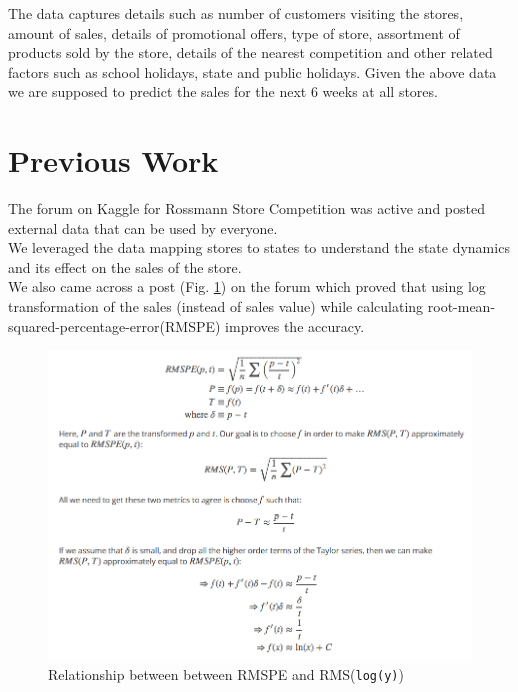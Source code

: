 \documentclass[12pt,a4paper]{article}
\begin{document}
The data captures details such as number of customers visiting the stores, amount of sales, details of promotional offers, type of store, assortment of products sold by the store, details of the nearest competition and other related factors such as school holidays, state and public holidays. Given the above data we are supposed to predict the sales for the next 6 weeks at all stores.

\section{Previous Work}
\label{previous}

The forum on Kaggle for Rossmann Store Competition was active and posted external data \cite{externaldata} that can be used by everyone. \\ We leveraged the data mapping stores to states\cite{storeonmap} to understand the state dynamics and its effect on the sales of the store. \\ We also came across a post\cite{logtransform} (Fig. \ref{fig:logtransform}) on the forum which proved that using log transformation of the sales (instead of sales value) while calculating root-mean-squared-percentage-error(RMSPE) improves the accuracy.
\begin{figure}[!htb]
	\begin{center}
		\includegraphics[scale=0.4]{images/Log_transform_for_rmspe.png}
		\caption{Relationship between between RMSPE and RMS(\texttt{log(y)})}
		\label{fig:logtransform}
	\end{center}
\end{figure}
\end{document}
